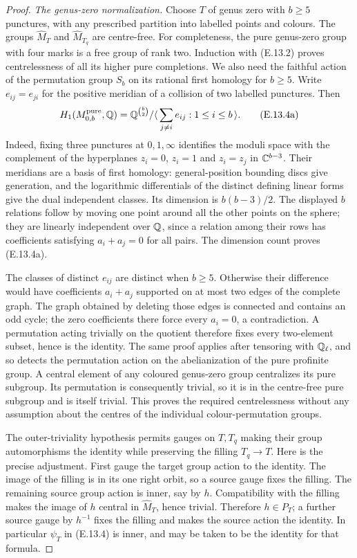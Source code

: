 \begin{proof}
\emph{The genus-zero normalization.}
Choose $T$ of genus zero with $b\ge5$ punctures, with any prescribed
partition into labelled points and colours.
The groups $\widehat M_T$ and $\widehat M_{T_q}$ are centre-free.
For completeness, the pure genus-zero group with four marks is a free
group of rank two. Induction with (E.13.2) proves centrelessness of all
its higher pure completions. We also need the faithful action of the
permutation group $S_b$ on its rational first homology for $b\ge5$.
Write $e_{ij}=e_{ji}$ for the positive meridian of a collision of two
labelled punctures. Then
\[
 H_1(M_{0,b}^{\rm pure},\mathbb Q)
 =\mathbb Q^{\binom b2}/
       \langle\,\sum_{j\ne i}e_{ij}:1\le i\le b\,\rangle.   \tag{E.13.4a}
\]
Indeed, fixing three punctures at $0,1,\infty$ identifies the moduli
space with the complement of the hyperplanes $z_i=0$, $z_i=1$ and
$z_i=z_j$ in $\mathbb C^{b-3}$. Their meridians are a basis of first homology:
general-position bounding discs give generation, and the logarithmic
differentials of the distinct defining linear forms give the dual
independent classes. Its dimension is $b(b-3)/2$. The displayed $b$
relations follow by moving one point around all the other points on
the sphere; they are linearly independent over $\mathbb Q$, since a relation
among their rows has coefficients satisfying $a_i+a_j=0$ for all pairs.
The dimension count proves (E.13.4a).

The classes of distinct $e_{ij}$ are distinct when $b\ge5$. Otherwise
their difference would have coefficients $a_i+a_j$ supported on at
most two edges of the complete graph. The graph obtained by deleting
those edges is connected and contains an odd cycle; the zero
coefficients there force every $a_i=0$, a contradiction. A permutation
acting trivially on the quotient therefore fixes every two-element
subset, hence is the identity. The same proof applies after tensoring
with $\mathbb Q_\ell$, and so detects the permutation action on the
abelianization of the pure profinite group. A central element of any
coloured genus-zero group centralizes its pure subgroup. Its permutation
is consequently trivial, so it is in the centre-free pure subgroup
and is itself trivial. This proves the required centrelessness without
any assumption about the centres of the individual colour-permutation
groups.

The outer-triviality hypothesis permits gauges on $T,T_q$ making their
group automorphisms the identity while preserving the filling
$T_q\to T$. Here is the precise adjustment. First gauge the target
group action to the identity. The image of the filling is in its one
right orbit, so a source gauge fixes the filling. The remaining source
group action is inner, say by $h$. Compatibility with the filling makes
the image of $h$ central in $\widehat M_T$, hence trivial. Therefore
$h\in P_T$; a further source gauge by $h^{-1}$ fixes the filling and
makes the source action the identity. In particular $\psi_T$ in
(E.13.4) is inner, and may be taken to be the identity for that formula.


\end{proof}
